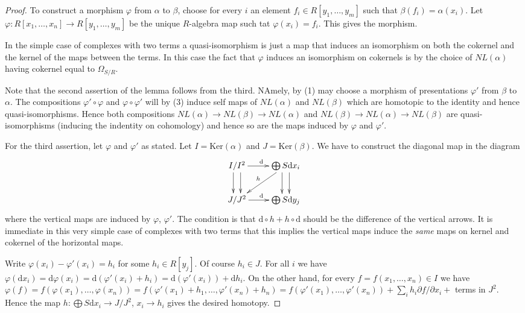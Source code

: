 \begin{proof}
To construct a morphism $\varphi$ from $\alpha$ to $\beta$, choose
for every $i$ an element $f_i \in R[y_1, \ldots, y_m]$
such that $\beta(f_i) = \alpha(x_i)$. Let
$\varphi : R[x_1, \ldots, x_n] \to R[y_1, \ldots, y_m]$ be the
unique $R$-algebra map such tat $\varphi(x_i) = f_i$.
This gives the morphism.

\medskip\noindent
In the simple case of complexes with two terms a quasi-isomorphism
is just a map that induces an isomorphism on both the cokernel
and the kernel of the maps between the terms. In this case the
fact that $\varphi$ induces an isomorphism on cokernels is by
the choice of $NL(\alpha)$ having cokernel equal to $\Omega_{S/R}$.

\medskip\noindent
Note that the second assertion of the lemma follows from the third.
NAmely, by (1) may choose a morphism of presentations
$\varphi'$ from $\beta$ to $\alpha$. The compositions
$\varphi' \circ \varphi$ and $\varphi \circ \varphi'$
will by (3) induce self maps of $NL(\alpha)$ and $NL(\beta)$
which are homotopic to the identity and hence quasi-isomorphisms.
Hence both compositions $NL(\alpha) \to NL(\beta) \to NL(\alpha)$
and $NL(\beta) \to NL(\alpha) \to NL(\beta)$ are quasi-isomorphisms
(inducing the indentity on cohomology) and hence so are the maps induced
by $\varphi$ and $\varphi'$.

\medskip\noindent
For the third assertion, let $\varphi$ and $\varphi'$ as stated.
Let $I = \text{Ker}(\alpha)$ and $J = \text{Ker}(\beta)$.
We have to construct the diagonal map in the diagram
$$
\xymatrix{
I/I^2 \ar[r]^{\text{d}} \ar@<1ex>[d] \ar@<-1ex>[d]
&
\bigoplus S\text{d}x_i \ar@<1ex>[d] \ar@<-1ex>[d] \ar[ld]_h
\\
J/J^2 \ar[r]^{\text{d}}
&
\bigoplus S\text{d}y_j
}
$$
where the vertical maps are induced by $\varphi$, $\varphi'$.
The condition is that $\text{d} \circ h + h \circ \text{d}$ should be
the difference of the vertical arrows. It is immediate in this
very simple case of complexes with two terms that this implies
the vertical maps induce the {\it same} maps on kernel and cokernel
of the horizontal maps.

\medskip\noindent
Write $\varphi(x_i) - \varphi'(x_i) = h_i$ for some
$h_i \in R[y_j]$. Of course $h_i \in J$. For all $i$ we have
$\varphi(\text{d}x_i) = \text{d}\varphi(x_i)
=\text{d}(\varphi'(x_i) + h_i) =
\text{d}(\varphi'(x_i)) + \text{d}h_i$. On the other hand,
for every $f = f(x_1, \ldots, x_n) \in I$ we have $\varphi(f) =
f(\varphi(x_1), \ldots, \varphi(x_n)) =
f(\varphi'(x_1) + h_1, \ldots, \varphi'(x_n) + h_n) =
f(\varphi'(x_1), \ldots, \varphi'(x_n)) +
\sum_i h_i \partial f/\partial x_i + $ terms in
$J^2$. Hence the map $h : \bigoplus S\text{d}x_i \to J/J^2$,
$x_i \to h_i$ gives the desired homotopy.
\end{proof}

